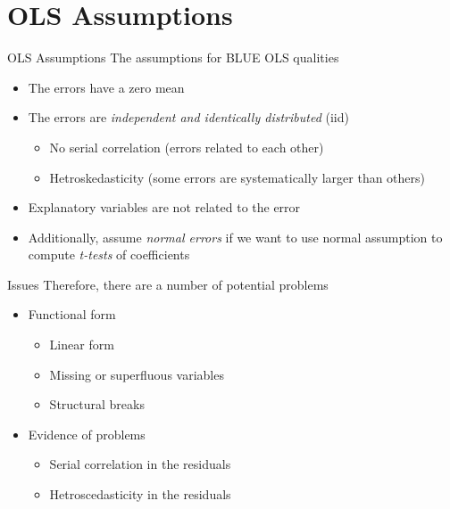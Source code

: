 \documentclass[14pt,xcolor=pdftex,dvipsnames,table]{beamer}\usepackage[]{graphicx}\usepackage[]{color}
\begin{document}
\section{OLS Assumptions}
\begin{frame}{OLS Assumptions}
The assumptions for BLUE OLS qualities
\pause
\begin{itemize}[<+-| alert@+>]
\item The errors have a zero mean
\item The errors are \emph{independent and identically distributed} (iid)
\begin{itemize}
\item No serial correlation (errors related to each other)
\item Hetroskedasticity (some errors are systematically larger than others)
\end{itemize}
\item Explanatory variables are not related to the error
\item Additionally, assume \emph{normal errors} if we want to use normal assumption to compute \emph{t-tests} of coefficients
\end{itemize}
\end{frame}

\begin{frame}{Issues}
Therefore, there are a number of potential problems
\begin{itemize}[<+-| alert@+>]
\item Functional form
\begin{itemize}
\item Linear form
\item Missing or superfluous variables
\item Structural breaks
\end{itemize}
\item Evidence of problems
\begin{itemize}
\item Serial correlation in the residuals
\item Hetroscedasticity in the residuals
\end{itemize}
\end{itemize}
\end{frame}
\end{document}
